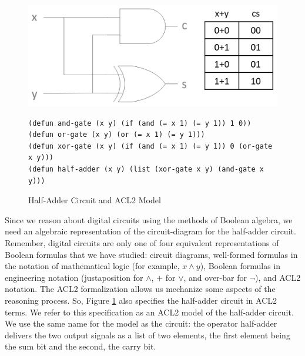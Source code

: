 \begin{figure}
\begin{center}
\includegraphics[scale=0.23]{Images/half-adder.png}
\begin{Verbatim}
(defun and-gate (x y) (if (and (= x 1) (= y 1)) 1 0))
(defun or-gate (x y) (or (= x 1) (= y 1)))
(defun xor-gate (x y) (if (and (= x 1) (= y 1)) 0 (or-gate x y)))
(defun half-adder (x y) (list (xor-gate x y) (and-gate x y)))
\end{Verbatim}
\end{center}
\caption{Half-Adder Circuit and ACL2 Model}
\label{fig:half-adder}
\end{figure}

Since we reason about digital circuits using the methods
of Boolean algebra, we need an algebraic representation
of the circuit-diagram for the half-adder circuit.
Remember, digital circuits are only one of four
equivalent representations of Boolean formulas that
we have studied: circuit diagrams, well-formed formulas
in the notation of mathematical logic (for example, $x \wedge y$),
Boolean formulas in engineering notation (justaposition for $\wedge$,
$+$ for $\vee$, and over-bar for $\neg$), and ACL2 notation.
The ACL2 formalization allows us mechanize some aspects of the reasoning process.
So, Figure \ref{fig:half-adder} also specifies the half-adder circuit in ACL2 terms.
We refer to this specification as an
ACL2 model of the half-adder circuit.
We use the same name for the model as the circuit:
the operator \textsf{half-adder} 
delivers the two output signals as a list of two elements,
the first element being the sum bit and the second, the carry bit.

